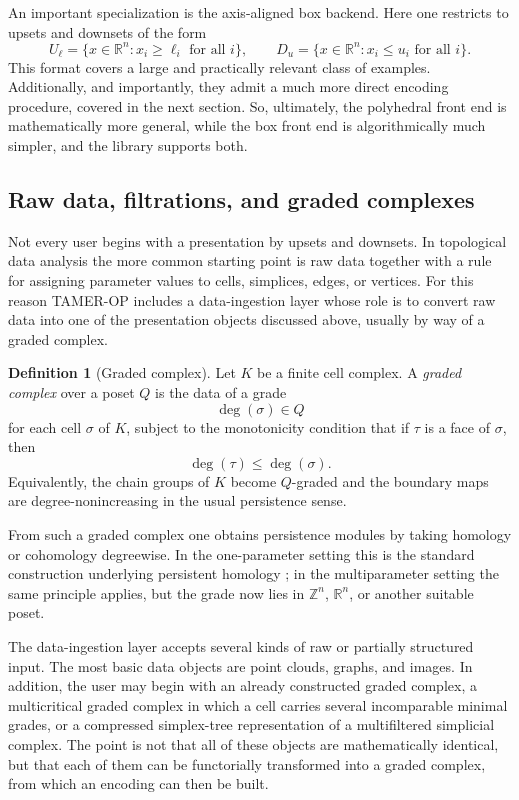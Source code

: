 \documentclass[11pt]{article}
\newcommand{\TAMER}{\textsc{TAMER-OP}}
\theoremstyle{definition}
\newtheorem{defn}[theorem]{Definition}
\theoremstyle{remark}
\begin{document}
An important specialization is the axis-aligned box backend.  Here one restricts to upsets and downsets of the form
\[
U_{\ell}=\{x\in\mathbb{R}^n:x_i\geq \ell_i\text{ for all }i\},
\qquad
D_u=\{x\in\mathbb{R}^n:x_i\leq u_i\text{ for all }i\}.
\]
This format covers a large and practically relevant class of examples. Additionally, and importantly, they admit a much more direct encoding procedure, covered in the next section. So, ultimately, the polyhedral front end is mathematically more general, while the box front end is algorithmically much simpler, and the library supports both.

\subsection{Raw data, filtrations, and graded complexes}

Not every user begins with a presentation by upsets and downsets.  In topological data analysis the more common starting point is raw data together with a rule for assigning parameter values to cells, simplices, edges, or vertices.  For this reason \TAMER{} includes a data-ingestion layer whose role is to convert raw data into one of the presentation objects discussed above, usually by way of a graded complex.

\begin{defn}[Graded complex]
	Let \(K\) be a finite cell complex.  A \emph{graded complex} over a poset \(Q\) is the data of a grade
	\[
	\deg(\sigma)\in Q
	\]
	for each cell \(\sigma\) of \(K\), subject to the monotonicity condition that if \(\tau\) is a face of \(\sigma\), then
	\[
	\deg(\tau)\leq \deg(\sigma).
	\]
	Equivalently, the chain groups of \(K\) become \(Q\)-graded and the boundary maps are degree-nonincreasing in the usual persistence sense.
\end{defn}

From such a graded complex one obtains persistence modules by taking homology or cohomology degreewise.  In the one-parameter setting this is the standard construction underlying persistent homology \cite{ZC05}; in the multiparameter setting the same principle applies, but the grade now lies in \(\mathbb{Z}^n\), \(\mathbb{R}^n\), or another suitable poset.

The data-ingestion layer accepts several kinds of raw or partially structured input.  The most basic data objects are point clouds, graphs, and images.  In addition, the user may begin with an already constructed graded complex, a multicritical graded complex in which a cell carries several incomparable minimal grades, or a compressed simplex-tree representation of a multifiltered simplicial complex.  The point is not that all of these objects are mathematically identical, but that each of them can be functorially transformed into a graded complex, from which an encoding can then be built.
\end{document}
